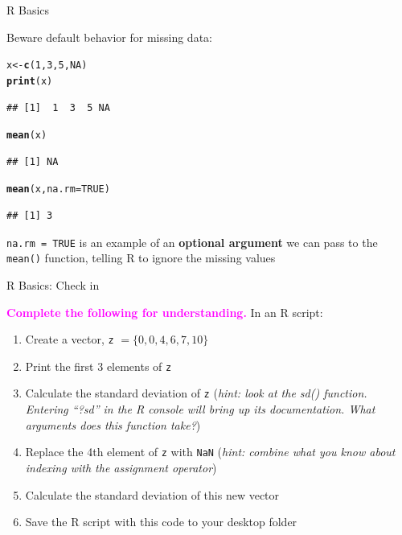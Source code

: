 \documentclass[svgnames,smaller]{beamer}\usepackage[]{graphicx}\usepackage[]{color}
\makeatletter
\newcommand{\hlnum}[1]{\textcolor[rgb]{0.686,0.059,0.569}{#1}}%
\newcommand{\hlstd}[1]{\textcolor[rgb]{0.345,0.345,0.345}{#1}}%
\newcommand{\hlkwb}[1]{\textcolor[rgb]{0.69,0.353,0.396}{#1}}%
\newcommand{\hlkwc}[1]{\textcolor[rgb]{0.333,0.667,0.333}{#1}}%
\newcommand{\hlkwd}[1]{\textcolor[rgb]{0.737,0.353,0.396}{\textbf{#1}}}%
\newenvironment{kframe}{%
 \def\at@end@of@kframe{}%
 \ifinner\ifhmode%
  \def\at@end@of@kframe{\end{minipage}}%
  \begin{minipage}{\columnwidth}%
 \fi\fi%
 \def\FrameCommand##1{\hskip\@totalleftmargin \hskip-\fboxsep
 \colorbox{shadecolor}{##1}\hskip-\fboxsep
     \hskip-\linewidth \hskip-\@totalleftmargin \hskip\columnwidth}%
 \MakeFramed {\advance\hsize-\width
   \@totalleftmargin\z@ \linewidth\hsize
   \@setminipage}}%
 {\par\unskip\endMakeFramed%
 \at@end@of@kframe}
\newenvironment{knitrout}{}{} %
\newcommand{\bmagenta}[1]{\textcolor{magenta}{\textbf{#1}}}
\makeatother
\begin{document}
\begin{frame}[fragile]{R Basics}

Beware default behavior for missing data:

\begin{knitrout}\scriptsize
{}\color{fgcolor}\begin{kframe}
\begin{alltt}
\hlstd{x} \hlkwb{<-} \hlkwd{c}\hlstd{(}\hlnum{1}\hlstd{,} \hlnum{3}\hlstd{,} \hlnum{5}\hlstd{,} \hlnum{NA}\hlstd{)}
\hlkwd{print}\hlstd{(x)}
\end{alltt}
\begin{verbatim}
## [1]  1  3  5 NA
\end{verbatim}
\begin{alltt}
\hlkwd{mean}\hlstd{(x)}
\end{alltt}
\begin{verbatim}
## [1] NA
\end{verbatim}
\begin{alltt}
\hlkwd{mean}\hlstd{(x,} \hlkwc{na.rm} \hlstd{=} \hlnum{TRUE}\hlstd{)}
\end{alltt}
\begin{verbatim}
## [1] 3
\end{verbatim}
\end{kframe}
\end{knitrout}

\texttt{na.rm = TRUE} is an example of an \textbf{optional argument} we can pass to the \texttt{mean()} function, telling R to ignore the missing values

\end{frame}



\begin{frame}[fragile]{R Basics: Check in}

\bmagenta{Complete the following for understanding.} In an R script:
\begin{enumerate}
    \item Create a vector, \texttt{z} $ = \{0, 0, 4, 6, 7, 10\}$
    \item Print the first 3 elements of \texttt{z}
    \item Calculate the standard deviation of \texttt{z} (\textit{hint: look at the sd() function. Entering ``?sd'' in the R console will bring up its documentation. What arguments does this function take?})
    \item Replace the 4th element of \texttt{z} with \texttt{NaN} (\textit{hint: combine what you know about indexing with the assignment operator})
    \item Calculate the standard deviation of this new vector
    \item Save the R script with this code to your desktop folder
\end{enumerate}


\end{frame}
\end{document}
